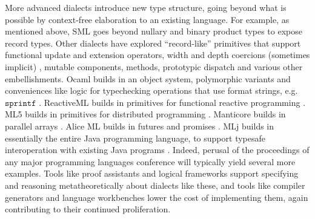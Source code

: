 More advanced dialects introduce  new type structure, going beyond what is possible by context-free elaboration to an existing language. For example, as mentioned above, SML goes beyond nullary and binary product types to expose record types. %
Other dialects have explored  ``record-like'' primitives that support functional update and extension operators, width and depth coercions (sometimes implicit)%
, mutable components, methods, prototypic dispatch and various other embellishments. Ocaml builds in an object system, polymorphic variants and  conveniences like logic for typechecking operations that use format strings, e.g. $\mathtt{sprintf}$ \cite{ocaml-manual}. ReactiveML builds in primitives for functional reactive programming \cite{mandel2005reactiveml}.  ML5 builds in primitives for distributed programming \cite{Murphy:2007:TDP:1793574.1793585}. Manticore builds in parallel arrays \cite{conf/popl/FluetRRSX07}. Alice ML builds in futures and promises \cite{AliceLookingGlass}. MLj builds in essentially the entire Java programming language, to support typesafe interoperation with existing Java programs \cite{Benton:1999:IWW:317636.317791}. Indeed, perusal of the proceedings of any major programming languages conference will typically yield several more examples. Tools like proof assistants and logical frameworks support specifying and reasoning metatheoretically about dialects like these, and tools like compiler generators and language workbenches lower the cost of implementing them, again contributing to their continued proliferation. 



